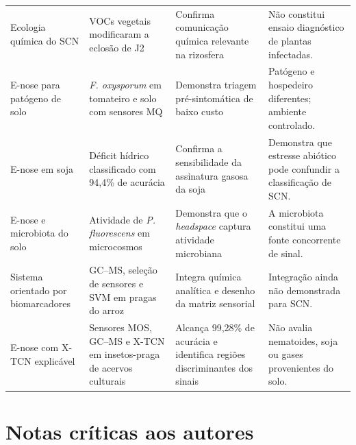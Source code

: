 \documentclass[12pt,a4paper]{article}
\begin{document}
\begin{longtable}{>{\RaggedRight\arraybackslash}p{} >{\RaggedRight\arraybackslash}p{} >{\RaggedRight\arraybackslash}p{} >{\RaggedRight\arraybackslash}p{}}
Ecologia química do SCN & VOCs vegetais modificaram a eclosão de J2 \cite{velloso2021} & Confirma comunicação química relevante na rizosfera & Não constitui ensaio diagnóstico de plantas infectadas. \\

E-nose para patógeno de solo & \textit{F. oxysporum} em tomateiro e solo com sensores MQ \cite{feng2022} & Demonstra triagem pré-sintomática de baixo custo & Patógeno e hospedeiro diferentes; ambiente controlado. \\

E-nose em soja & Déficit hídrico classificado com 94,4\% de acurácia \cite{herrmann2024} & Confirma a sensibilidade da assinatura gasosa da soja & Demonstra que estresse abiótico pode confundir a classificação de SCN. \\

E-nose e microbiota do solo & Atividade de \textit{P. fluorescens} em microcosmos \cite{decesare2011} & Demonstra que o \textit{headspace} captura atividade microbiana & A microbiota constitui uma fonte concorrente de sinal. \\

Sistema orientado por biomarcadores & GC--MS, seleção de sensores e SVM em pragas do arroz \cite{li2025planthopper} & Integra química analítica e desenho da matriz sensorial & Integração ainda não demonstrada para SCN. \\

E-nose com X-TCN explicável & Sensores MOS, GC--MS e X-TCN em insetos-praga de acervos culturais \cite{chen2026xtcn} & Alcança 99,28\% de acurácia e identifica regiões discriminantes dos sinais & Não avalia nematoides, soja ou gases provenientes do solo. \\

\end{longtable}
\normalsize

\section*{Notas críticas aos autores}
\end{document}
